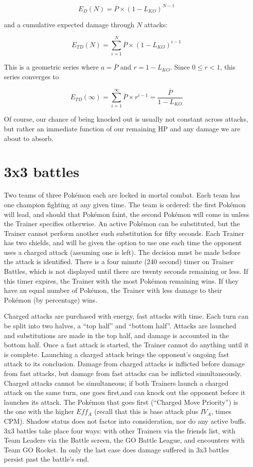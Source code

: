 \[ E_D(N) = \overline{P} \times (1 - L_{KO})^{N-1} \]

and a cumulative expected damage through $N$ attacks:

\[ E_{TD}(N) = \sum^N_{i=1} \overline{P} \times (1 - L_{KO})^{i-1} \]

This is a geometric series where $a = \overline{P}$ and $r = 1 - L_{KO}$.
Since $0 \leq r < 1$, this series converges to

\[ E_{TD}(\infty) = \sum^\infty_{i=1} \overline{P} \times r^{i-1} = \frac{\overline{P}}{1 - L_{KO}} \]

Of course, our chance of being knocked out is usually not constant across
 attacks, but rather an immediate function of our remaining HP and any
 damage we are about to absorb.

\section{3x3 battles\label{sec:3x3}}
Two teams of three Pokémon each are locked in mortal combat.
Each team has one champion fighting at any given time.
The team is ordered: the first Pokémon will lead, and should that Pokémon
  faint, the second Pokémon will come in unless the Trainer specifies otherwise.
An active Pokémon can be substituted, but the Trainer cannot perform another
  such substitution for fifty seconds.
Each Trainer has two shields, and will be given the option to use one each time
  the opponent uses a charged attack (assuming one is left).
The decision must be made before the attack is identified.
There is a four minute (240 second) timer on Trainer Battles, which is not displayed
  until there are twenty seconds remaining or less.
If this timer expires, the Trainer with the most Pokémon remaining wins.
If they have an equal number of Pokémon, the Trainer with less damage to their
  Pokémon (by percentage) wins.

Charged attacks are purchased with energy, fast attacks with time.
Each turn can be split into two halves, a ``top half'' and ``bottom half''.
Attacks are launched and substitutions are made in the top half, and damage is accounted in the bottom half.
Once a fast attack is started, the Trainer cannot do anything until it is complete.
Launching a charged attack brings the opponent's ongoing fast attack to its conclusion.
Damage from charged attacks is inflicted before damage from fast attacks,
  but damage from fast attacks can be inflicted simultaneously.
Charged attacks cannot be simultaneous; if both Trainers launch a charged attack
  on the same turn, one goes first,and can knock out the opponent before it
  launches its attack.
The Pokémon that goes first (``Charged Move Priority'') is the one with the
  higher $Eff_A$ (recall that this is base attack plus $IV_A$, times CPM).
Shadow status does not factor into consideration, nor do any active buffs.
3x3 battles take place four ways: with other Trainers via the friends list,
 with Team Leaders via the Battle screen, the GO Battle League,
 and encounters with Team GO Rocket.
In only the last case does damage suffered in 3x3 battles persist past the battle's end.

